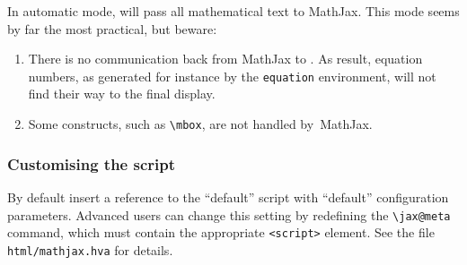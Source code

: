 In automatic mode, \hevea{} will pass all mathematical text to \textsf{MathJax}.
This mode seems by far the most practical, but beware:
\begin{enumerate}
\item There is no communication back from \textsf{MathJax} to \hevea{}.
As result, equation numbers, as generated for instance by the
\texttt{equation} environment, will not find their way to the final display.
\item Some constructs, such as \verb+\mbox+, are not handled
by~\textsf{MathJax}.
\end{enumerate}

\subsubsection{Customising the  script}
By default \hevea{} insert a reference to the ``default''
 script
with ``default'' configuration parameters.
Advanced users can change this setting by redefining the \verb+\jax@meta+
command, which must contain the appropriate \verb+<script>+ element.
See the file \verb+html/mathjax.hva+ for details.


